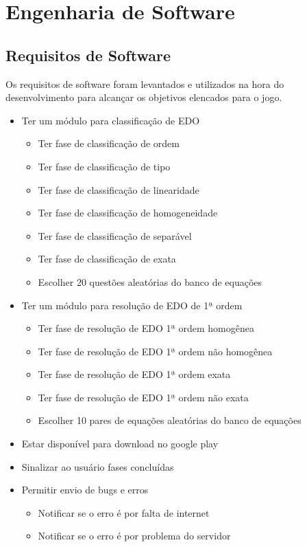 \chapter[Engenharia de Software]{Engenharia de Software}

\section[Requisitos de Software]{Requisitos de Software}
Os requisitos de software foram levantados e utilizados na hora do desenvolvimento para alcançar os objetivos elencados para o jogo. 

\begin{itemize}
	\item Ter um módulo para classificação de EDO
		\begin{itemize}
			\item Ter fase de classificação de ordem
			\item Ter fase de classificação de tipo
			\item Ter fase de classificação de linearidade
			\item Ter fase de classificação de homogeneidade
			\item Ter fase de classificação de separável
			\item Ter fase de classificação de exata
			\item Escolher 20 questões aleatórias do banco de equações
		\end{itemize}

	\item Ter um módulo para resolução de EDO de 1ª ordem
		\begin{itemize}
			\item Ter fase de resolução de EDO 1ª ordem homogênea
			\item Ter fase de resolução de EDO 1ª ordem não homogênea
			\item Ter fase de resolução de EDO 1ª ordem exata
			\item Ter fase de resolução de EDO 1ª ordem não exata
			\item Escolher 10 pares de equações aleatórias do banco de equações
		\end{itemize}

	\item Estar disponível para download no google play
	\item Sinalizar ao usuário fases concluídas
	\item Permitir envio de bugs e erros
		\begin{itemize}
			\item Notificar se o erro é por falta de internet
			\item Notificar se o erro é por problema do servidor
		\end{itemize}


\end{itemize}
